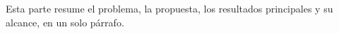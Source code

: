 
Esta parte resume el problema, la propuesta, los resultados principales y su alcance, en un solo párrafo.
